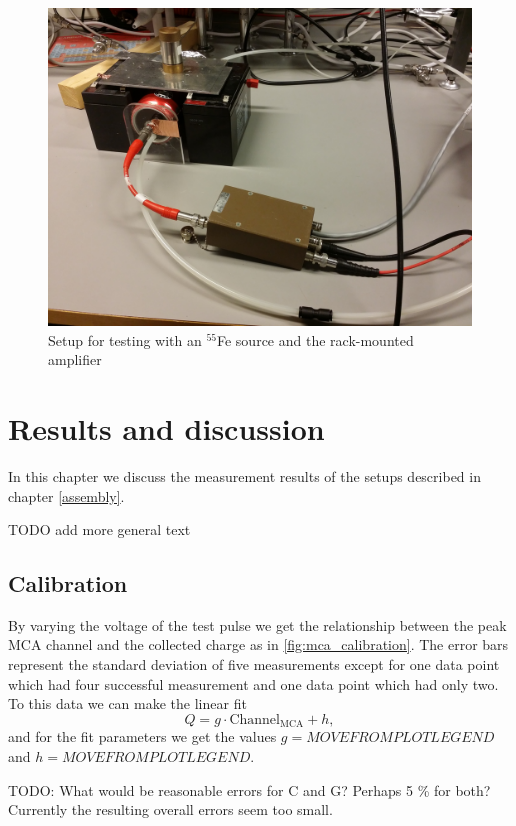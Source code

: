 \documentclass[a4paper]{article}
\begin{document}
\begin{figure}[ht!]
\centering
\includegraphics[width=\textwidth]{fig/IMG_20201130_144418.jpg}
\caption{Setup for testing with an $^{55}$Fe source and the rack-mounted amplifier}
\label{fig:setup_testing}
\end{figure}


\clearpage
\section{Results and discussion}
\label{results}
In this chapter we discuss the measurement results of the setups described in chapter \ref{assembly}.

TODO add more general text


\subsection{Calibration}
\label{results_calibration}
By varying the voltage of the test pulse we get the relationship between the peak MCA channel and the collected charge as in \ref{fig:mca_calibration}.
The error bars represent the standard deviation of five measurements except for one data point which had four successful measurement and one data point which had only two.
To this data we can make the linear fit
\begin{equation}
Q = g \cdot \text{Channel}_\text{MCA} + h,
\end{equation}
and for the fit parameters we get the values $g = MOVEFROMPLOTLEGEND$ and $h = MOVEFROMPLOTLEGEND$.

TODO: What would be reasonable errors for C and G?
Perhaps 5 \% for both?
Currently the resulting overall errors seem too small.
\end{document}
